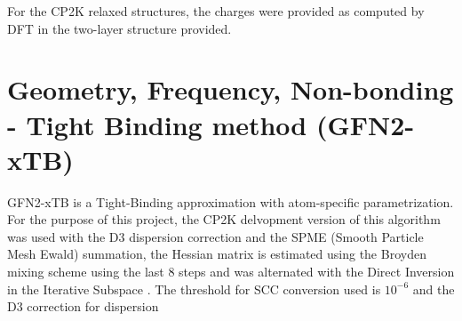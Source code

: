 




For the CP2K relaxed structures, the charges were provided as computed by DFT in the two-layer structure provided.

 
\section{Geometry, Frequency, Non-bonding - Tight Binding method (GFN2-xTB)}

GFN2-xTB is a Tight-Binding approximation with atom-specific parametrization. For the purpose of this project, the CP2K delvopment version of this algorithm was used with the D3 dispersion correction and the SPME (Smooth Particle Mesh Ewald) summation, the Hessian matrix is estimated using the Broyden mixing scheme using the last 8 steps and was alternated with the Direct Inversion in the Iterative Subspace \cite{pulay_convergence_1980}\cite{pulay_improved_1982}\cite{shepard_comments_2007}. The threshold for SCC conversion used is $10^{-6}$ and the D3 correction for dispersion%
 
